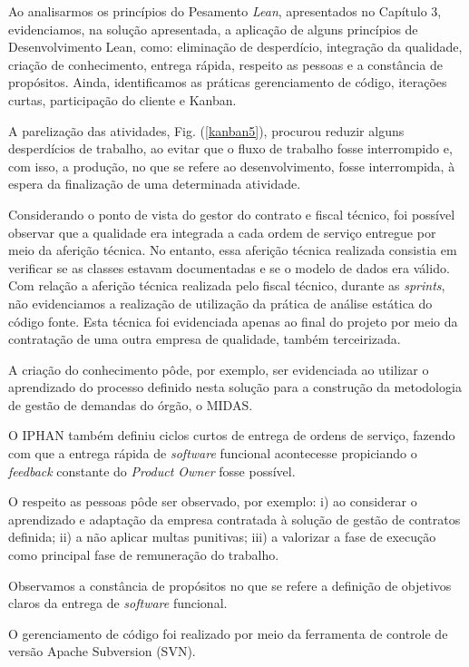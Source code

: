 Ao analisarmos os princípios do Pesamento \textit{Lean}, apresentados no Capítulo 3, evidenciamos, na solução apresentada, a aplicação de alguns princípios de Desenvolvimento Lean, como: eliminação de desperdício, integração da qualidade, criação de conhecimento, entrega rápida, respeito as pessoas e a constância de propósitos. Ainda, identificamos as práticas gerenciamento de código, iterações curtas, participação do cliente e Kanban.

A parelização das atividades, Fig. (\ref{kanban5}), procurou reduzir alguns desperdícios de trabalho, ao evitar que o fluxo de trabalho fosse interrompido e, com isso, a produção, no que se refere ao desenvolvimento, fosse interrompida, à espera da finalização de uma determinada atividade. 

Considerando o ponto de vista do gestor do contrato e fiscal técnico, foi possível observar que a qualidade era integrada a cada ordem de serviço entregue por meio da aferição técnica. No entanto, essa aferição técnica realizada consistia em verificar se as classes estavam documentadas e se o modelo de dados era válido. Com relação a aferição técnica realizada pelo fiscal técnico, durante as \textit{sprints}, não evidenciamos a realização de utilização da prática de análise estática do código fonte. Esta técnica foi evidenciada apenas ao final do projeto por meio da contratação de uma outra empresa de qualidade, também terceirizada.

A criação do conhecimento pôde, por exemplo, ser evidenciada ao utilizar o aprendizado do processo definido nesta solução para a construção da metodologia de gestão de demandas do órgão, o MIDAS.

O IPHAN também definiu ciclos curtos de entrega de ordens de serviço, fazendo com que a entrega rápida de \textit{software} funcional acontecesse propiciando o \textit{feedback} constante do \textit{Product Owner} fosse possível. 

O respeito as pessoas pôde ser observado, por exemplo: i) ao considerar o aprendizado e adaptação da empresa contratada à solução de gestão de contratos definida; ii) a não aplicar multas punitivas; iii) a valorizar a fase de execução como principal fase de remuneração do trabalho. 

Observamos a constância de propósitos no que se refere a definição de objetivos claros da entrega de \textit{software} funcional.

O gerenciamento de código foi realizado por meio da ferramenta de controle de versão Apache Subversion (SVN). 

